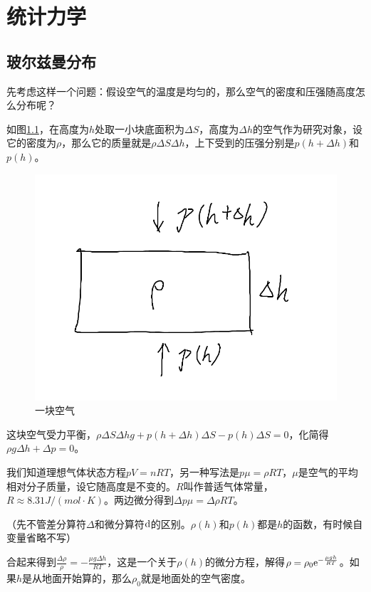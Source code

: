 \chapter{统计力学}
\section{玻尔兹曼分布}
先考虑这样一个问题：假设空气的温度是均匀的，那么空气的密度和压强随高度怎么分布呢？

如图\ref{fig-air-block}，在高度为$h$处取一小块底面积为$\Delta S$，高度为$\Delta h$的空气作为研究对象，设它的密度为$\rho$，那么它的质量就是$\rho \Delta S \Delta h$，上下受到的压强分别是$p(h+\Delta h)$和$p(h)$。
\begin{figure}[htb]
\centering
\includegraphics[scale=0.5]{fig/air-block}
\caption{一块空气}
\label{fig-air-block}
\end{figure}

这块空气受力平衡，$\rho \Delta S \Delta h g+p(h+\Delta h) \Delta S-p(h) \Delta S=0$，化简得$\rho g \Delta h+\Delta p=0$。

我们知道理想气体状态方程$p V=n R T$，另一种写法是$p \mu=\rho R T$，$\mu$是空气的平均相对分子质量，设它随高度是不变的。$R$叫作普适气体常量， $R \approx 8.31 \unit{J/(mol \cdot K)}$。两边微分得到$\Delta p \mu=\Delta \rho R T$。

（先不管差分算符$\Delta$和微分算符$\mathop{}\!\mathrm{d}$的区别。$\rho(h)$和$p(h)$都是$h$的函数，有时候自变量省略不写）

合起来得到$\frac{\Delta \rho}{\rho}=-\frac{\mu g \Delta h}{R T}$，这是一个关于$\rho(h)$的微分方程，解得$\rho=\rho_0 \mathrm{e}^{-\frac{\mu g h}{R T}}$。如果$h$是从地面开始算的，那么$\rho_0$就是地面处的空气密度。

